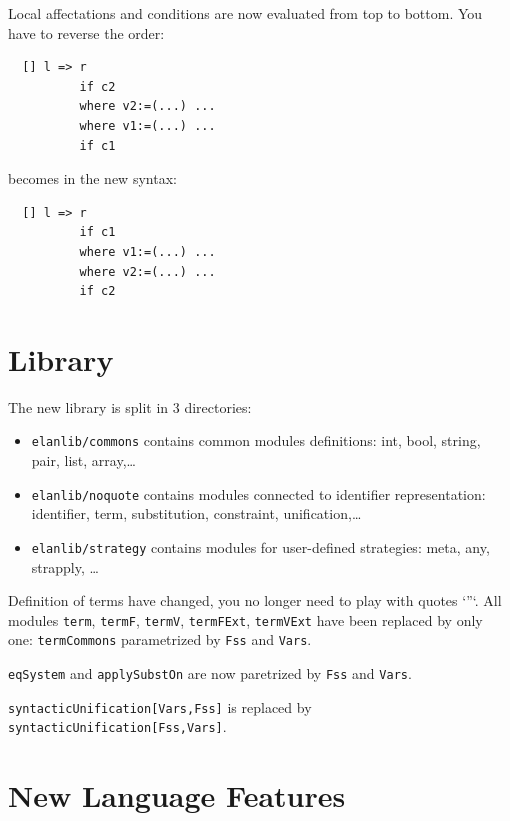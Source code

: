 \documentclass{article}
\begin{document}
Local affectations and conditions are now evaluated from top to
bottom. You have to reverse the order:

\begin{verbatim}
  [] l => r
          if c2
          where v2:=(...) ...
          where v1:=(...) ...
          if c1
\end{verbatim}

becomes in the new syntax:
\begin{verbatim}
  [] l => r
          if c1
          where v1:=(...) ...
          where v2:=(...) ...
          if c2
\end{verbatim}

\section{Library}
The new library is split in 3 directories:
\begin{itemize}
\item \texttt{elanlib/commons} contains common modules definitions:
  int, bool, string, pair, list, array,\ldots
\item \texttt{elanlib/noquote} contains modules connected to
  identifier representation: identifier, term, substitution,
  constraint, unification,\ldots
\item \texttt{elanlib/strategy} contains modules for user-defined
  strategies: meta, any, strapply, \ldots
\end{itemize}

Definition of terms have changed, you no longer need to play with
quotes `{''}`. All modules \texttt{term}, \texttt{termF},
\texttt{termV}, \texttt{termFExt}, \texttt{termVExt} have been
replaced by only one: \texttt{termCommons} parametrized by
\texttt{Fss} and \texttt{Vars}.

\texttt{eqSystem} and \texttt{applySubstOn} are now paretrized by
\texttt{Fss} and \texttt{Vars}.

\texttt{syntacticUnification[Vars,Fss]} is replaced by
\texttt{syntacticUnification[Fss,Vars]}.
 

\section{New Language Features}
\end{document}
